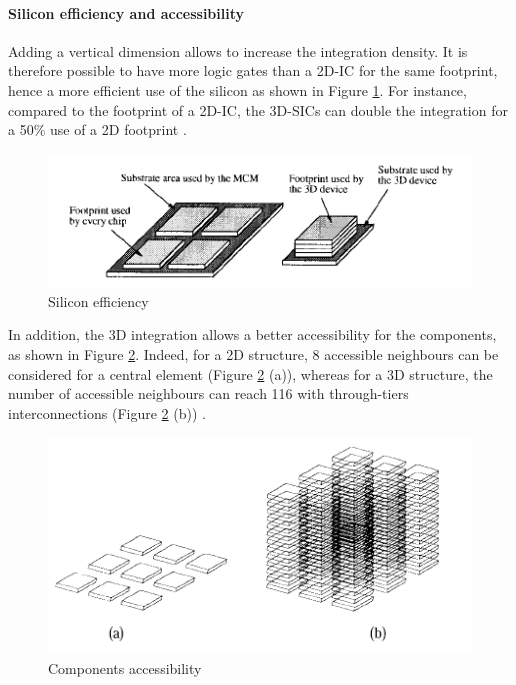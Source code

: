 \paragraph{Silicon efficiency and accessibility}

Adding a vertical dimension allows to increase the integration density. It is therefore possible to have more logic gates than a 2D-IC for the same footprint, hence a more efficient use of the silicon as shown in Figure \ref{fig:footprint}. For instance, compared to the footprint of a 2D-IC, the 3D-SICs can double the integration for a 50\% use of a 2D footprint \cite{659500}.

\begin{figure}[h!]
\begin{center}
\includegraphics[width=0.75\linewidth]{footprint.png}
\end{center}
\vspace{-0.5cm}
\caption{Silicon efficiency \cite{659500}}
\label{fig:footprint}
\end{figure}

In addition, the 3D integration allows a better accessibility for the components, as shown in Figure \ref{fig:accessibility}. Indeed, for a 2D structure, 8 accessible neighbours can be considered for a central element (Figure \ref{fig:accessibility} (a)), whereas for a 3D structure, the number of accessible neighbours can reach 116 with through-tiers interconnections (Figure \ref{fig:accessibility} (b)) \cite{659500}.

\begin{figure}[h!]
\begin{center}
\includegraphics[width=0.75\linewidth]{accessibility.png}
\end{center}
\vspace{-0.5cm}
\caption{Components accessibility \cite{659500}}
\label{fig:accessibility}
\end{figure}

